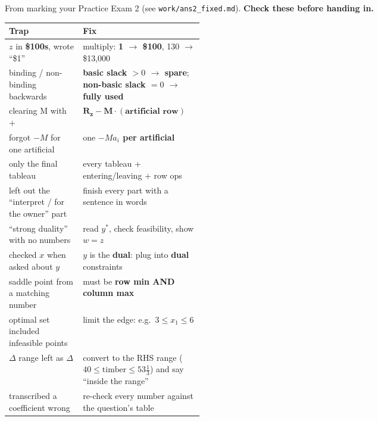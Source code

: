 \documentclass[10pt,a4paper]{article}
\newcommand{\thead}[1]{\textbf{#1}}
\begin{document}
From marking your Practice Exam 2 (see \texttt{work/ans2\_fixed.md}). \textbf{Check these before handing in.}

\begin{tabularx}{\linewidth}{@{}>{\raggedright\arraybackslash}p{0.38\linewidth} L@{}}
\toprule
\thead{\textcolor{trap}{Trap}} & \thead{Fix} \\
\midrule
$z$ in \textbf{\$100s}, wrote ``\$1'' & multiply: \textbf{1 $\to$ \$100}, 130 $\to$ \$13{,}000 \\
binding / non-binding backwards & \textbf{basic slack $> 0$ $\to$ spare}; \textbf{non-basic slack $= 0$ $\to$ fully used} \\
clearing M with $+$ & $\mathbf{R_z - M\cdot(\text{artificial row})}$ \\
forgot $-M$ for one artificial & one \textbf{$-Ma_i$ per artificial} \\
only the final tableau & every tableau + entering/leaving + row ops \\
left out the ``interpret / for the owner'' part & finish every part with a sentence in words \\
``strong duality'' with no numbers & read $y^*$, check feasibility, show $w = z$ \\
checked $x$ when asked about $y$ & $y$ is the \textbf{dual}: plug into \textbf{dual} constraints \\
saddle point from a matching number & must be \textbf{row min AND column max} \\
optimal set included infeasible points & limit the edge: e.g.\ $3 \leq x_1 \leq 6$ \\
$\Delta$ range left as $\Delta$ & convert to the RHS range ($40 \leq \text{timber} \leq 53\frac13$) and say ``inside the range'' \\
transcribed a coefficient wrong & re-check every number against the question's table \\
\bottomrule
\end{tabularx}
\end{document}
